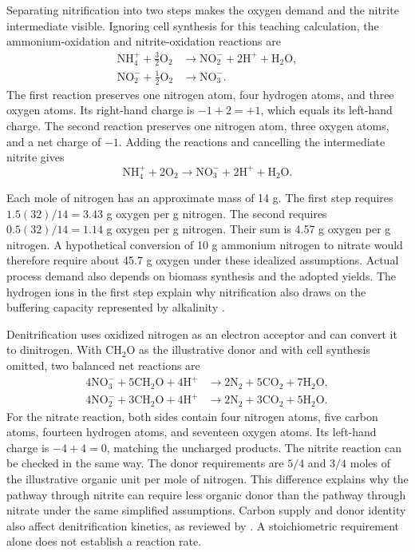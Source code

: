 Separating nitrification into two steps makes the oxygen demand and the nitrite intermediate visible. Ignoring cell synthesis for this teaching calculation, the ammonium-oxidation and nitrite-oxidation reactions are
\begin{align}
\mathrm{NH_4^+}+\tfrac32\mathrm{O_2}
&\longrightarrow\mathrm{NO_2^-}+2\mathrm{H^+}+\mathrm{H_2O},
\label{eq:teaching_ammonium_oxidation}\\
\mathrm{NO_2^-}+\tfrac12\mathrm{O_2}
&\longrightarrow\mathrm{NO_3^-}.
\label{eq:teaching_nitrite_oxidation}
\end{align}
The first reaction preserves one nitrogen atom, four hydrogen atoms, and three oxygen atoms. Its right-hand charge is $-1+2=+1$, which equals its left-hand charge. The second reaction preserves one nitrogen atom, three oxygen atoms, and a net charge of $-1$. Adding the reactions and cancelling the intermediate nitrite gives
\begin{equation}
\mathrm{NH_4^+}+2\mathrm{O_2}
\longrightarrow\mathrm{NO_3^-}+2\mathrm{H^+}+\mathrm{H_2O}.
\label{eq:teaching_overall_nitrification}
\end{equation}

Each mole of nitrogen has an approximate mass of 14 g. The first step requires $1.5(32)/14=3.43$ g oxygen per g nitrogen. The second requires $0.5(32)/14=1.14$ g oxygen per g nitrogen. Their sum is 4.57 g oxygen per g nitrogen. A hypothetical conversion of 10 g ammonium nitrogen to nitrate would therefore require about 45.7 g oxygen under these idealized assumptions. Actual process demand also depends on biomass synthesis and the adopted yields. The hydrogen ions in the first step explain why nitrification also draws on the buffering capacity represented by alkalinity \citep{Guerrero2011,Henze2006}.

Denitrification uses oxidized nitrogen as an electron acceptor and can convert it to dinitrogen. With $\mathrm{CH_2O}$ as the illustrative donor and with cell synthesis omitted, two balanced net reactions are
\begin{align}
4\mathrm{NO_3^-}+5\mathrm{CH_2O}+4\mathrm{H^+}
&\longrightarrow2\mathrm{N_2}+5\mathrm{CO_2}+7\mathrm{H_2O},
\label{eq:teaching_nitrate_denitrification}\\
4\mathrm{NO_2^-}+3\mathrm{CH_2O}+4\mathrm{H^+}
&\longrightarrow2\mathrm{N_2}+3\mathrm{CO_2}+5\mathrm{H_2O}.
\label{eq:teaching_nitrite_denitrification}
\end{align}
For the nitrate reaction, both sides contain four nitrogen atoms, five carbon atoms, fourteen hydrogen atoms, and seventeen oxygen atoms. Its left-hand charge is $-4+4=0$, matching the uncharged products. The nitrite reaction can be checked in the same way. The donor requirements are $5/4$ and $3/4$ moles of the illustrative organic unit per mole of nitrogen. This difference explains why the pathway through nitrite can require less organic donor than the pathway through nitrate under the same simplified assumptions. Carbon supply and donor identity also affect denitrification kinetics, as reviewed by \citet{Lu2014}. A stoichiometric requirement alone does not establish a reaction rate.

